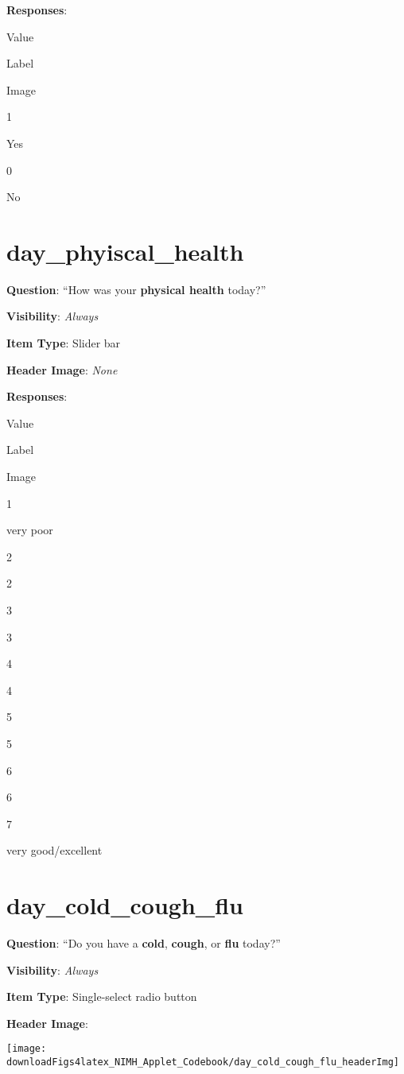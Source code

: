 \documentclass[]{book}
\begin{document}
\textbf{Responses}:

Value

Label

Image

1

Yes

0

No

\hypertarget{day_phyiscal_health}{%
\section{day\_phyiscal\_health}\label{day_phyiscal_health}}

\textbf{Question}: ``How was your \textbf{physical health} today?''

\textbf{Visibility}: \emph{Always}

\textbf{Item Type}: Slider bar

\textbf{Header Image}: \emph{None}

\textbf{Responses}:

Value

Label

Image

1

very poor

2

2

3

3

4

4

5

5

6

6

7

very good/excellent

\hypertarget{day_cold_cough_flu}{%
\section{day\_cold\_cough\_flu}\label{day_cold_cough_flu}}

\textbf{Question}: ``Do you have a \textbf{cold}, \textbf{cough}, or \textbf{flu} today?''

\textbf{Visibility}: \emph{Always}

\textbf{Item Type}: Single-select radio button

\textbf{Header Image}:

\begin{flushleft}\texttt{[image: downloadFigs4latex\_NIMH\_Applet\_Codebook/day\_cold\_cough\_flu\_headerImg]} \end{flushleft}
\end{document}
